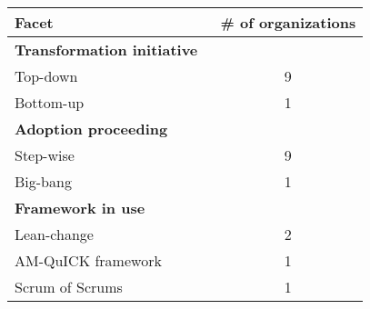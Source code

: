 \centering

 \label{processtable}

\begin{tabular}{ l c }
    \bfseries{Facet} & \bfseries{\# of organizations} \\
    \hline
    \bfseries{Transformation initiative} \\
    Top-down & 9 \\
    Bottom-up & 1 \\
    \hline
    \bfseries{Adoption proceeding} \\
    Step-wise & 9 \\
    Big-bang & 1 \\
    \hline
    \bfseries{Framework in use} \\
    Lean-change & 2 \\
    AM-QuICK framework & 1 \\
    Scrum of Scrums & 1 \\
\end{tabular}
\justify

